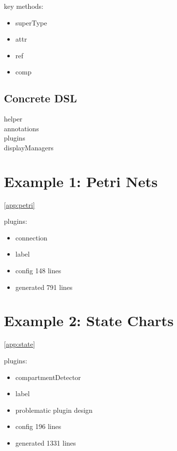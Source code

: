 key methods: 
\begin{itemize}
  \item superType
  \item attr
  \item ref
  \item comp
\end{itemize}

\subsection{Concrete DSL}

\begin{description}
  \item[helper]
  \item[annotations]
  \item[plugins]
  \item[displayManagers]
\end{description}



\section{Example 1: Petri Nets}

\ref{app:petri}

plugins:
\begin{itemize}
  \item connection
  \item label
\end{itemize}

\begin{itemize}
  \item config 148 lines
  \item generated 791 lines
\end{itemize}



\section{Example 2: State Charts}

\ref{app:state}

plugins:
\begin{itemize}
  \item compartmentDetector
  \item label 
\end{itemize}

\begin{itemize}
  \item problematic plugin design
  \item config 196 lines
  \item generated 1331 lines
\end{itemize}
